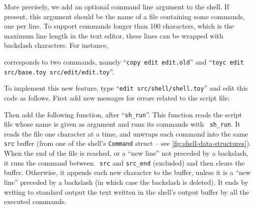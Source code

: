 More precisely, we add an optional command line argument to the shell. If
present, this argument should be the name of a file containing some commands,
one per line. To support commands longer than 100 characters, which is the
maximum line length in the text editor, these lines can be wrapped with
backslash characters. For instance,


\noindent corresponds to two commands, namely ``{\tt copy edit edit.old}'' and
``{\tt toyc edit src/base.toy src/edit/edit.toy}''.

To implement this new feature, type ``{\tt edit src/shell/shell.toy}'' and edit
this code as follows. First add new messages for errors related to the script
file:




Then add the following function, after ``{\tt sh\_run}''. This function reads
the script file whose name is given as argument and runs its commands with {\tt
sh\_run}. It reads the file one character at a time, and unwraps each command
into the same {\tt src} buffer (from one of the shell's {\tt Command} struct --
see \cref{fig:shell-data-structures}). When the end of the file is reached, or
a ``new line'' not preceded by a backslash, it runs the command between {\tt
src} and {\tt src\_end} (excluded) and then clears the buffer. Otherwise, it
appends each new character to the buffer, unless it is a ``new line'' preceded
by a backslash (in which case the backslash is deleted). It ends by writing to
standard output the text written in the shell's output buffer by all the
executed commands.

